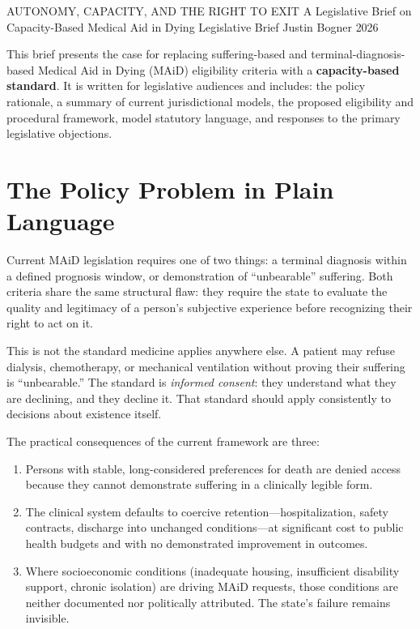 \documentclass[11pt, letterpaper]{article}
\begin{document}
\campaigntitle%
  {AUTONOMY, CAPACITY, AND THE RIGHT TO EXIT}%
  {A Legislative Brief on Capacity-Based Medical Aid in Dying}%
  {Legislative Brief}%
  {Justin Bogner}%
  {2026}

\suitenote

\begin{policybox}[title={\sffamily\bfseries\small\color{C@accent} Purpose of this Brief}]
This brief presents the case for replacing suffering-based and terminal-diagnosis-based
Medical Aid in Dying (MAiD) eligibility criteria with a \textbf{capacity-based standard}.
It is written for legislative audiences and includes: the policy rationale, a summary of
current jurisdictional models, the proposed eligibility and procedural framework, model
statutory language, and responses to the primary legislative objections.
\end{policybox}

\bigskip

\section{The Policy Problem in Plain Language}

Current MAiD legislation requires one of two things: a terminal diagnosis within a defined
prognosis window, or demonstration of ``unbearable'' suffering. Both criteria share the same
structural flaw: they require the state to evaluate the quality and legitimacy of a person's
subjective experience before recognizing their right to act on it.

This is not the standard medicine applies anywhere else. A patient may refuse dialysis,
chemotherapy, or mechanical ventilation without proving their suffering is ``unbearable.''
The standard is \emph{informed consent}: they understand what they are declining, and they
decline it. That standard should apply consistently to decisions about existence itself.

The practical consequences of the current framework are three:

\begin{enumerate}
  \item Persons with stable, long-considered preferences for death are denied access because
    they cannot demonstrate suffering in a clinically legible form.
  \item The clinical system defaults to coercive retention---hospitalization, safety contracts,
    discharge into unchanged conditions---at significant cost to public health budgets and
    with no demonstrated improvement in outcomes.
  \item Where socioeconomic conditions (inadequate housing, insufficient disability support,
    chronic isolation) are driving MAiD requests, those conditions are neither documented
    nor politically attributed. The state's failure remains invisible.
\end{enumerate}
\end{document}
